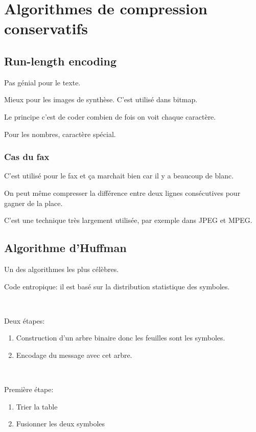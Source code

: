 \documentclass[a4paper,11pt]{article}
\begin{document}
\section{Algorithmes de compression conservatifs}

\subsection{Run-length encoding}

Pas génial pour le texte.

Mieux pour les images de synthèse. C'est utilisé dans bitmap.

Le principe c'est de coder combien de fois on voit chaque caractère.

Pour les nombres, caractère spécial.

\subsubsection{Cas du fax}

C'est utilisé pour le fax et ça marchait bien car il y a beaucoup de blanc.

On peut même compresser la différence entre deux lignes consécutives pour gagner
de la place.

C'est une technique très largement utilisée, par exemple dans JPEG et MPEG.

\subsection{Algorithme d'Huffman}

Un des algorithmes les plus célèbres.

Code entropique: il est basé sur la distribution statistique des symboles.

\

Deux étapes:

\begin{enumerate}
\item Construction d'un arbre binaire donc les feuilles sont les symboles.
\item Encodage du message avec cet arbre.
\end{enumerate}

\

Première étape:

\begin{enumerate}
\item Trier la table
\item Fusionner les deux symboles
\end{enumerate}
\end{document}
